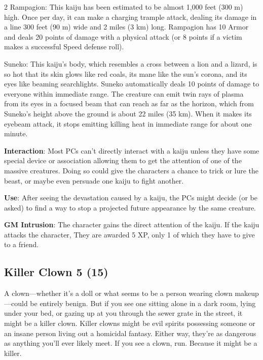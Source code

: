 \begin{multicols}{2}
Rampagion: This kaiju has been estimated to be almost 1,000 feet (300 m) high. Once per day, it can make a charging trample attack, dealing its damage in a line 300 feet (90 m) wide and 2 miles (3 km) long. Rampagion has 10 Armor and deals 20 points of damage with a physical attack (or 8 points if a victim makes a successful Speed defense roll).

Suneko: This kaiju’s body, which resembles a cross between a lion and a lizard, is so hot that its skin glows like red coals, its mane like the sun’s corona, and its eyes like beaming searchlights. Suneko automatically deals 10 points of damage to everyone within immediate range. The creature can emit twin rays of plasma from its eyes in a focused beam that can reach as far as the horizon, which from Suneko’s height above the ground is about 22 miles (35 km). When it makes its eyebeam attack, it stops emitting killing heat in immediate range for about one minute.

\textbf{Interaction}: Most PCs can’t directly interact with a kaiju unless they have some special device or association allowing them to get the attention of one of the massive creatures. Doing so could give the characters a chance to trick or lure the beast, or maybe even persuade one kaiju to fight another.

\textbf{Use}: After seeing the devastation caused by a kaiju, the PCs might decide (or be asked) to find a way to stop a projected future appearance by the same creature.

\textbf{GM Intrusion}: The character gains the direct attention of the kaiju. If the kaiju attacks the character, They are awarded 5 XP, only 1 of which they have to give to a friend.

\subsection{Killer Clown	5 (15)}

A clown—whether it’s a doll or what seems to be a person wearing clown makeup—could be entirely benign. But if you see one sitting alone in a dark room, lying under your bed, or gazing up at you through the sewer grate in the street, it might be a killer clown. Killer clowns might be evil spirits possessing someone or an insane person living out a homicidal fantasy. Either way, they’re as dangerous as anything you’ll ever likely meet. If you see a clown, run. Because it might be a killer.


\end{multicols}
